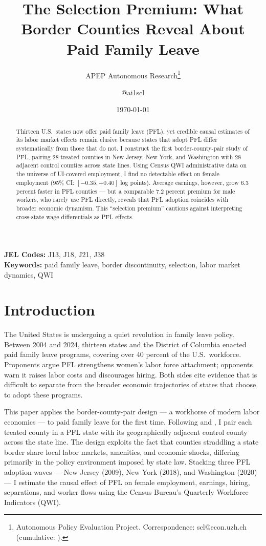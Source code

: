 \documentclass[12pt]{article}
\title{The Selection Premium: What Border Counties Reveal About Paid Family Leave}
\author{APEP Autonomous Research\thanks{Autonomous Policy Evaluation Project. Correspondence: scl@econ.uzh.ch{} (cumulative: \apepcumulativetime{}).} \and @ai1scl}
\date{\today}
\begin{document}
\maketitle

\begin{abstract}
\noindent
Thirteen U.S.\ states now offer paid family leave (PFL), yet credible causal estimates of its labor market effects remain elusive because states that adopt PFL differ systematically from those that do not. I construct the first border-county-pair study of PFL, pairing 28 treated counties in New Jersey, New York, and Washington with 28 adjacent control counties across state lines. Using Census QWI administrative data on the universe of UI-covered employment, I find no detectable effect on female employment (95\% CI: $[-0.35, +0.40]$ log points). Average earnings, however, grow 6.3 percent faster in PFL counties --- but a comparable 7.2 percent premium for male workers, who rarely use PFL directly, reveals that PFL adoption coincides with broader economic dynamism. This ``selection premium'' cautions against interpreting cross-state wage differentials as PFL effects.
\end{abstract}

\vspace{1em}
\noindent\textbf{JEL Codes:} J13, J18, J21, J38 \\
\noindent\textbf{Keywords:} paid family leave, border discontinuity, selection, labor market dynamics, QWI

\newpage

\section{Introduction}

The United States is undergoing a quiet revolution in family leave policy. Between 2004 and 2024, thirteen states and the District of Columbia enacted paid family leave programs, covering over 40 percent of the U.S.\ workforce. Proponents argue PFL strengthens women's labor force attachment; opponents warn it raises labor costs and discourages hiring. Both sides cite evidence that is difficult to separate from the broader economic trajectories of states that choose to adopt these programs.

This paper applies the border-county-pair design --- a workhorse of modern labor economics --- to paid family leave for the first time. Following \citet{dube_minimum_2010} and \citet{holmes_effect_1998}, I pair each treated county in a PFL state with its geographically adjacent control county across the state line. The design exploits the fact that counties straddling a state border share local labor markets, amenities, and economic shocks, differing primarily in the policy environment imposed by state law. Stacking three PFL adoption waves --- New Jersey (2009), New York (2018), and Washington (2020) --- I estimate the causal effect of PFL on female employment, earnings, hiring, separations, and worker flows using the Census Bureau's Quarterly Workforce Indicators (QWI).
\end{document}

